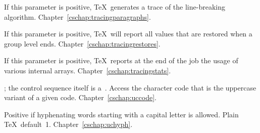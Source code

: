 \begin{glossinventory}
\item [\cs{tracingparagraphs}]
      If this parameter is positive, \TeX\ generates      
      a trace of the line-breaking algorithm.
Chapter~\ref{cschap:tracingparagraphs}.

\item [\cs{tracingrestores}]
      If this parameter is positive, \TeX\ will report      
      all values that are restored when a group level ends.
Chapter~\ref{cschap:tracingrestores}.

\item [\cs{tracingstats}]
      If this parameter is positive, \TeX\ reports at the      
      end of the job the usage of various internal arrays.
Chapter~\ref{cschap:tracingstats}.

\item [\cs{uccode\gr{8-bit number}}]
      ; the control sequence itself
      is a~.
      Access
      the character code that is the uppercase variant of a given code.
Chapter~\ref{cschap:uccode}.

\item [\cs{uchyph}]
      Positive if hyphenating words starting with a capital 
      letter is allowed. 
      Plain \TeX\ default~1.
Chapter~\ref{cschap:uchyph}.


\end{glossinventory}
